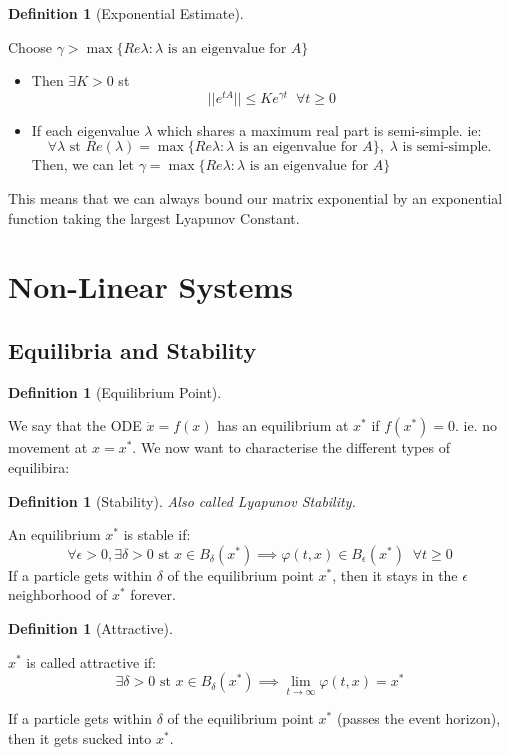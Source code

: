 \documentclass{article}
\newtheorem{defn}[thm]{Definition}
\begin{document}
\begin{defn}[Exponential Estimate]
\end{defn}
Choose $\gamma > \max\{Re \lambda : \lambda \text{ is an eigenvalue for } A\}$
\begin{itemize}
    \item Then $\exists K >0$ st 
    \[||e^{tA}|| \leq Ke^{\gamma t} \; \; \forall t \geq 0\]
    \item If each eigenvalue $\lambda$ which shares a maximum real part is semi-simple. ie: 
    \[\forall \lambda \text{ st } Re(\lambda) = \max\{Re \lambda : \lambda \text{ is an eigenvalue for } A \}, \; \lambda \text{ is semi-simple. } \]
    Then, we can let $\gamma = \max\{Re \lambda : \lambda \text{ is an eigenvalue for } A \}$
\end{itemize}
This means that we can always bound our matrix exponential by an exponential function taking the largest Lyapunov Constant.

\newpage
\section{Non-Linear Systems}
\subsection{Equilibria and Stability}
\begin{defn}[Equilibrium Point]
\end{defn}
We say that the ODE $\dot x = f(x)$  has an equilibrium at $x^*$ if $f(x^*) = 0$. ie. no movement at $x = x^*$. We now want to characterise the different types of equilibira:

\begin{defn}[Stability] Also called Lyapunov Stability.
\end{defn}
An equilibrium $x^*$ is stable if: 
\[\forall \epsilon > 0, \exists \delta > 0 \text{ st } x \in B_\delta(x^*) \implies \varphi(t,x) \in B_\epsilon(x^*) \;\; \forall t \geq 0\]
If a particle gets within $\delta$ of the equilibrium point $x^*$, then it stays in the $\epsilon$ neighborhood of $x^*$ forever.

\begin{defn}[Attractive]\end{defn}
$x^*$ is called attractive if: 
\[\exists \delta > 0 \text{ st } x \in B_\delta(x^*) \implies \lim_{t\to\infty}\varphi(t,x) = x^* \]

If a particle gets within $\delta$ of the equilibrium point $x^*$ (passes the event horizon), then it gets sucked into $x^*$.
\end{document}

